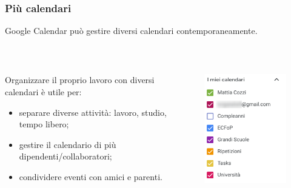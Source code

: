 \documentclass[]{beamer}
\begin{document}
\begin{frame}
\frametitle{Più calendari}
Google Calendar può gestire diversi calendari contemporaneamente.

~

\begin{columns}
  \begin{column}{.5\textwidth}
    Organizzare il proprio lavoro con diversi calendari è utile per:
\begin{itemize}
  \item separare diverse attività: lavoro, studio, tempo libero;\pause
  \item gestire il calendario di più dipendenti/collaboratori;\pause
  \item condividere eventi con amici e parenti.
\end{itemize}
  \end{column}
  \begin{column}{.4\textwidth}
    \begin{figure}
      \includegraphics[width=\columnwidth]{img/calendarcals.png}
    \end{figure}
  \end{column}
\end{columns}
\end{frame}
\end{document}
